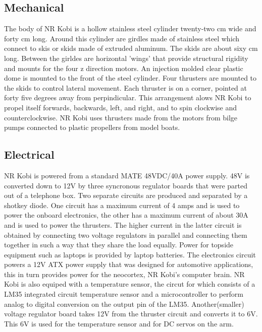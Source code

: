\documentclass{proposalnsf}
\begin{document}
\subsection{Mechanical}
The body of NR Kobi is a hollow stainless steel cylinder twenty-two cm  wide and forty cm long. Around this cylinder are girdles made of stainless steel which connect to skis or skids made of extruded aluminum. The skids are about sixy cm long. Between the girldes are horizontal 'wings' that provide structural rigidity and mounts for the four z direction motors. An injection molded clear plastic dome is mounted to the front of the steel cylinder. Four thrusters are mounted to the skids to control lateral movement. Each thruster is on a corner, pointed at forty five degrees away from perpindicular. This arrangement alows NR Kobi to propel itself forwards, backwards, left, and right, and to spin clockwise and counterclockwise. NR Kobi uses thrusters made from the motors from bilge pumps connected to plastic propellers from model boats.
\subsection{Electrical}
NR Kobi is powered from a standard MATE 48VDC/40A power supply. 48V is converted down to 12V by three syncronous regulator boards that were parted out of a telephone box. Two separate circuits are produced and separated by a shotkey diode. One circuit has a maximum current of 4 amps and is used to power the onboard electronics, the other has a maximum current of about 30A and is used to power the thrusters. The higher current in the latter circuit is obtained by connecting two voltage regulators in parallel and connecting them together in such a way that they share the load equally. Power for topside equipment such as laptops is provided by laptop batteries. The electronics circuit powers a 12V ATX power supply that was designed for automotive applications, this in turn provides power for the neocortex, NR Kobi's computer brain. NR Kobi is also equiped with a temperature sensor, the circut for which consists of a LM35 integrated circuit temperature sensor and a microcontroller to perform analog to digital conversion on the output pin of the LM35. Another(smaller) voltage regulator board takes 12V from the thruster circuit and converts it to 6V. This 6V is used for the temperature sensor and for DC servos on the arm. 
\end{document}
